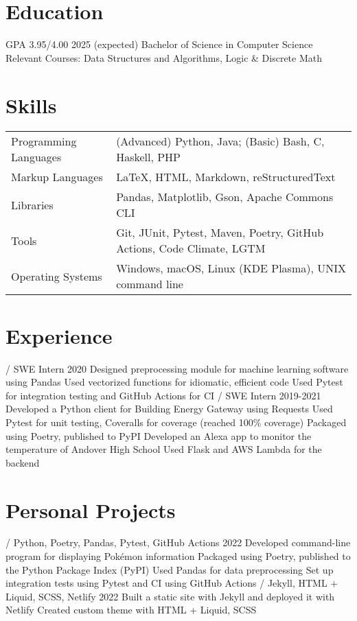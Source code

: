 \begin{outline}

\renewcommand{\outlinei}{description}

\0 \section{Education}
     GPA 3.95/4.00 \hfill 2025 (expected)
        \2 Bachelor of Science in Computer Science
        \2 Relevant Courses: Data Structures and Algorithms, Logic \& Discrete Math

\0 \section{Skills}
\0 
    \noindent\begin{tabular}{@{\bfseries}l l}
        Programming Languages & (Advanced) Python, Java; (Basic) Bash, C, Haskell, PHP \\
        Markup Languages & \LaTeX, HTML, Markdown, reStructuredText \\
        Libraries & Pandas, Matplotlib, Gson, Apache Commons CLI \\
        Tools & Git, JUnit, Pytest, Maven, Poetry, GitHub Actions, Code Climate, LGTM \\
        Operating Systems & Windows, macOS, Linux (KDE Plasma), UNIX command line \\
    \end{tabular}

\0 \section{Experience}
     / SWE Intern \hfill 2020
        \2 Designed preprocessing module for machine learning software using Pandas
        \2 Used vectorized functions for idiomatic, efficient code
        \2 Used Pytest for integration testing and GitHub Actions for CI
     / SWE Intern \hfill 2019-2021
        \2 Developed a Python client for Building Energy Gateway using Requests
        \2 Used Pytest for unit testing, Coveralls for coverage (reached 100\% coverage)
        \2 Packaged using Poetry, published to PyPI
        \2 Developed an Alexa app to monitor the temperature of Andover High School
        \2 Used Flask and AWS Lambda for the backend

\0 \section{Personal Projects}
    \1[Pokésummary] / Python, Poetry, Pandas, Pytest, GitHub Actions \hfill 2022
        \2 Developed command-line program for displaying Pokémon information
        \2 Packaged using Poetry, published to the Python Package Index (PyPI)
        \2 Used Pandas for data preprocessing
        \2 Set up integration tests using Pytest and CI using GitHub Actions
     / Jekyll, HTML + Liquid, SCSS, Netlify \hfill 2022
        \2 Built a static site with Jekyll and deployed it with Netlify
        \2 Created custom theme with HTML + Liquid, SCSS


\end{outline}
